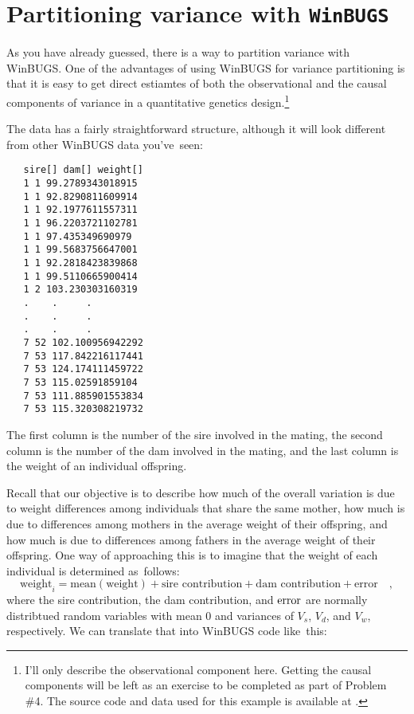 \chapter{Partitioning variance with {\tt WinBUGS}}

As you have already guessed, there is a way to partition variance with
WinBUGS. One of the advantages of using WinBUGS for variance
partitioning is that it is easy to get direct estiamtes of both the
observational and the causal components of variance in a quantitative
genetics design.\footnote{I'll only describe the observational
  component here. Getting the causal components will be left as an
  exercise to be completed as part of Problem \#4. The source code and
  data used for this example is available at
  .}

The data has a fairly straightforward structure, although it will look
different from other WinBUGS data you've~seen:

\begin{verbatim}
   sire[] dam[] weight[]
   1 1 99.2789343018915
   1 1 92.8290811609914
   1 1 92.1977611557311
   1 1 96.2203721102781
   1 1 97.435349690979
   1 1 99.5683756647001
   1 1 92.2818423839868
   1 1 99.5110665900414
   1 2 103.230303160319
   .    .     .
   .    .     .
   .    .     .
   7 52 102.100956942292
   7 53 117.842216117441
   7 53 124.174111459722
   7 53 115.02591859104
   7 53 111.885901553834
   7 53 115.320308219732
\end{verbatim}

The first column is the number of the sire involved in the mating, the
second column is the number of the dam involved in the mating, and the
last column is the weight of an individual offspring.

Recall that our objective is to describe how much of the overall
variation is due to weight differences among individuals that share
the same mother, how much is due to differences among mothers in the
average weight of their offspring, and how much is due to differences
among fathers in the average weight of their offspring. One way of
approaching this is to imagine that the weight of each individual is
determined as~follows:
\[
\mbox{weight}_i = \mbox{mean}(\mbox{weight})
                  + \mbox{sire contribution}
                  + \mbox{dam contribution}
                  + \mbox{error} \quad ,
\]
where the sire contribution, the dam contribution, and $\hbox{error}$
are normally distribtued random variables with mean $0$ and variances
of $V_s$, $V_d$, and $V_w$, respectively. We can translate that into
WinBUGS code like~this:

